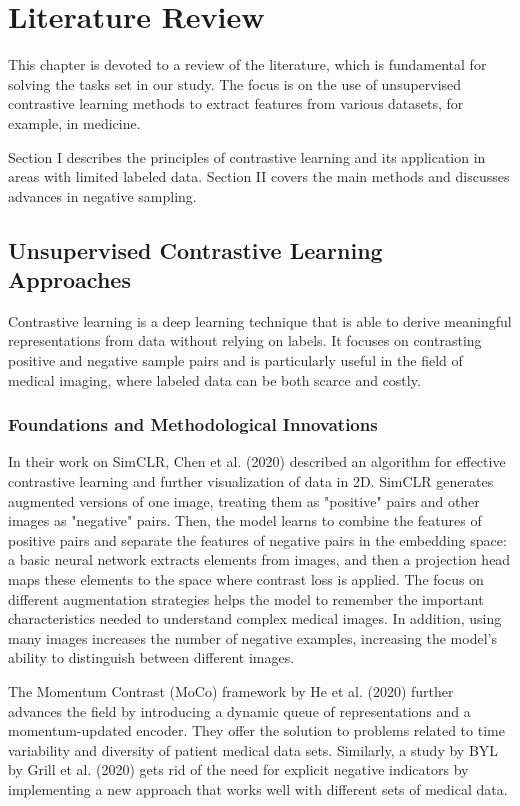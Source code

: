 \chapter{Literature Review}
\label{chap:lr}

This chapter is devoted to a review of the literature, which is fundamental for solving the tasks set in our study. The focus is on the use of unsupervised contrastive learning methods to extract features from various datasets, for example, in medicine. 

Section I describes the principles of contrastive learning and its application in areas with limited labeled data. Section II covers the main methods and discusses advances in negative sampling.

\section{Unsupervised Contrastive Learning Approaches}
Contrastive learning is a deep learning technique that is able to derive meaningful representations from data without relying on labels. It focuses on contrasting positive and negative sample pairs and is particularly useful in the field of medical imaging, where labeled data can be both scarce and costly.

\subsection{Foundations and Methodological Innovations}

In their work on SimCLR, Chen et al. (2020) \cite{tsimcne} described an algorithm for effective contrastive learning and further visualization of data in 2D. SimCLR generates augmented versions of one image, treating them as "positive" pairs and other images as "negative" pairs. Then, the model learns to combine the features of positive pairs and separate the features of negative pairs in the embedding space: a basic neural network extracts elements from images, and then a projection head maps these elements to the space where contrast loss is applied. The focus on different augmentation strategies helps the model to remember the important characteristics needed to understand complex medical images. In addition, using many images increases the number of negative examples, increasing the model's ability to distinguish between different images.

The Momentum Contrast (MoCo) framework by He et al. (2020) \cite{moco} further advances the field by introducing a dynamic queue of representations and a momentum-updated encoder. They offer the solution to problems related to time variability and diversity of patient medical data sets. Similarly, a study by BYL by Grill et al. (2020) \cite{byol} gets rid of the need for explicit negative indicators by implementing a new approach that works well with different sets of medical data.

